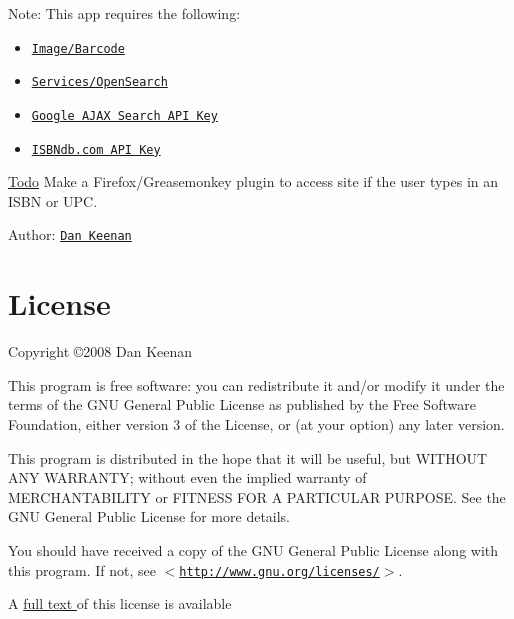 \begin{Desc}
\item[Note:]This app requires the following:\begin{itemize}
\item \href{http://pear.php.net/package/Image_Barcode/}{\tt Image/Barcode}\item \href{http://pear.php.net/package/Services_OpenSearch/}{\tt Services/OpenSearch}\item \href{http://code.google.com/apis/ajaxsearch/signup.html}{\tt Google AJAX Search API Key}\item \href{https://isbndb.com/account/dev/keys/}{\tt ISBNdb.com API Key}\end{itemize}
\end{Desc}
\begin{Desc}
\item[\hyperlink{todo__todo000001}{Todo}]Make a Firefox/Greasemonkey plugin to access site if the user types in an ISBN or UPC.\end{Desc}
\begin{Desc}
\item[Author:]\href{http://dankeenan.org}{\tt Dan Keenan} \end{Desc}
\hypertarget{index_license}{}\section{License}\label{index_license}
Copyright \copyright 2008 Dan Keenan

This program is free software: you can redistribute it and/or modify it under the terms of the GNU General Public License as published by the Free Software Foundation, either version 3 of the License, or (at your option) any later version.

This program is distributed in the hope that it will be useful, but WITHOUT ANY WARRANTY; without even the implied warranty of MERCHANTABILITY or FITNESS FOR A PARTICULAR PURPOSE. See the GNU General Public License for more details.

You should have received a copy of the GNU General Public License along with this program. If not, see $<$\href{http://www.gnu.org/licenses/}{\tt http://www.gnu.org/licenses/}$>$.



A \hyperlink{license}{full text } of this license is available 